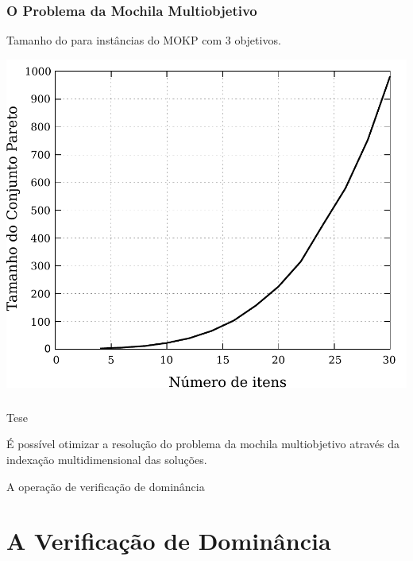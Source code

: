 \documentclass[10pt,xcolor=table,fleqn]{beamer}
\newcommand{\mytitle}[1]{
  \begin{center}
    \color{defblue}
    { \LARGE #1 }
  \end{center}
}
\begin{document}
\begin{frame}
	\frametitle{O Problema da Mochila Multiobjetivo}
  Tamanho do \paretoset{} para instâncias do MOKP com 3 objetivos.
  \begin{center}
   	\includegraphics[scale=0.4]{../img/mokp/par-grow-d3}
  \end{center}
\end{frame}

\begin{frame}
	\frametitle{}
  \begin{block}{Tese}
    \begin{center}
      É possível otimizar a resolução do problema da mochila
      multiobjetivo através da indexação multidimensional das soluções.
    \end{center}
  \end{block}
\end{frame}

\begin{frame}
  \mytitle{A operação de verificação de dominância}
\end{frame}

\section{A Verificação de Dominância}
\end{document}
